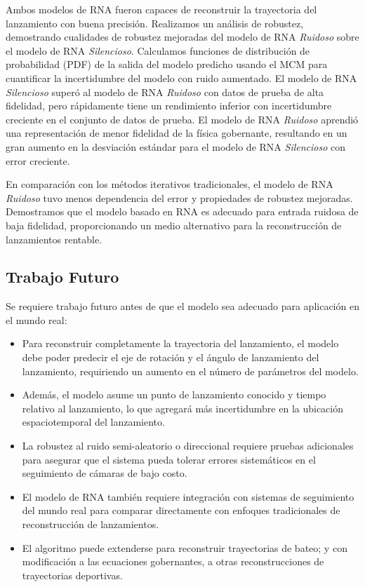 \documentclass[12pt,a4paper]{article}
\begin{document}
Ambos modelos de RNA fueron capaces de reconstruir la trayectoria del lanzamiento con buena precisión. Realizamos un análisis de robustez, demostrando cualidades de robustez mejoradas del modelo de RNA \textit{Ruidoso} sobre el modelo de RNA \textit{Silencioso}. Calculamos funciones de distribución de probabilidad (PDF) de la salida del modelo predicho usando el MCM para cuantificar la incertidumbre del modelo con ruido aumentado. El modelo de RNA \textit{Silencioso} superó al modelo de RNA \textit{Ruidoso} con datos de prueba de alta fidelidad, pero rápidamente tiene un rendimiento inferior con incertidumbre creciente en el conjunto de datos de prueba. El modelo de RNA \textit{Ruidoso} aprendió una representación de menor fidelidad de la física gobernante, resultando en un gran aumento en la desviación estándar para el modelo de RNA \textit{Silencioso} con error creciente.

En comparación con los métodos iterativos tradicionales, el modelo de RNA \textit{Ruidoso} tuvo menos dependencia del error y propiedades de robustez mejoradas. Demostramos que el modelo basado en RNA es adecuado para entrada ruidosa de baja fidelidad, proporcionando un medio alternativo para la reconstrucción de lanzamientos rentable.

\subsection{Trabajo Futuro}

Se requiere trabajo futuro antes de que el modelo sea adecuado para aplicación en el mundo real:

\begin{itemize}
    \item Para reconstruir completamente la trayectoria del lanzamiento, el modelo debe poder predecir el eje de rotación y el ángulo de lanzamiento del lanzamiento, requiriendo un aumento en el número de parámetros del modelo.
    \item Además, el modelo asume un punto de lanzamiento conocido y tiempo relativo al lanzamiento, lo que agregará más incertidumbre en la ubicación espaciotemporal del lanzamiento.
    \item La robustez al ruido semi-aleatorio o direccional requiere pruebas adicionales para asegurar que el sistema pueda tolerar errores sistemáticos en el seguimiento de cámaras de bajo costo.
    \item El modelo de RNA también requiere integración con sistemas de seguimiento del mundo real para comparar directamente con enfoques tradicionales de reconstrucción de lanzamientos.
    \item El algoritmo puede extenderse para reconstruir trayectorias de bateo; y con modificación a las ecuaciones gobernantes, a otras reconstrucciones de trayectorias deportivas.
\end{itemize}
\end{document}
